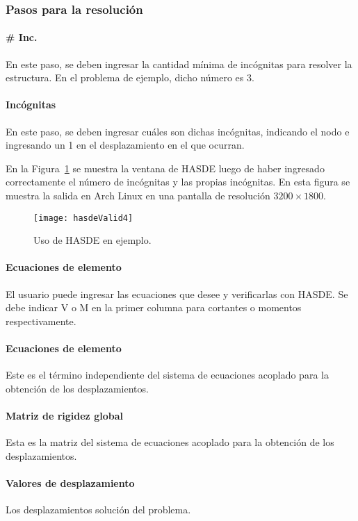 \subsubsection{Pasos para la resolución}

\paragraph{\# Inc.}
En este paso, se deben ingresar la cantidad mínima de incógnitas para resolver la estructura. En el problema de ejemplo, dicho número es 3.

\paragraph{Incógnitas}
En este paso, se deben ingresar cuáles son dichas incógnitas, indicando el nodo e ingresando un 1 en el desplazamiento en el que ocurran.

En la Figura~\ref{fig:eje} se muestra la ventana de HASDE luego de haber ingresado correctamente el número de incógnitas y las propias incógnitas. En esta figura se muestra la salida en Arch Linux en una pantalla de resolución $3200 \times 1800$.
%
\begin{figure}[htb]
	\begin{center}
		\texttt{[image: hasdeValid4]}
	\end{center}
	\caption{Uso de HASDE en ejemplo.}
	\label{fig:eje}
\end{figure}

\paragraph{Ecuaciones de elemento}
El usuario puede ingresar las ecuaciones que desee y verificarlas con HASDE. Se debe indicar V o M en la primer columna para cortantes o momentos respectivamente.

\paragraph{Ecuaciones de elemento}
Este es el término independiente del sistema de ecuaciones acoplado para la obtención de los desplazamientos.

\paragraph{Matriz de rigidez global}
Esta es la matriz del sistema de ecuaciones acoplado para la obtención de los desplazamientos.

\paragraph{Valores de desplazamiento}
Los desplazamientos solución del problema.
